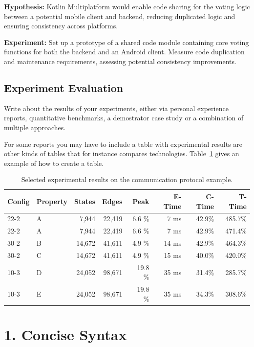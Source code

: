 \textbf{Hypothesis:} Kotlin Multiplatform would enable code sharing for the voting logic between a potential mobile client and backend, reducing duplicated logic and ensuring consistency across platforms.

\textbf{Experiment:} Set up a prototype of a shared code module containing core voting functions for both the backend and an Android client. Measure code duplication and maintenance requirements, assessing potential consistency improvements.


\subsection{Experiment Evaluation}

Write about the results of your experiments, either via personal experience reports, quantitative benchmarks, a demostrator case study or a combination of multiple approaches.


For some reports you may have to include a table with experimental
results are other kinds of tables that for instance compares
technologies. Table~\ref{tab:results} gives an example of how to create a table.

\begin{table}[bth]
	\centering
	\begin{tabular}{llrrrrrr}
		Config & Property & States & Edges & Peak & E-Time & C-Time & T-Time
		\\ \hline \hline
		22-2 & A   &    7,944  &   22,419  &  6.6  \%  &  7 ms & 42.9\% &  485.7\% \\
		22-2 & A   &    7,944  &   22,419  &  6.6  \%  &  7 ms & 42.9\% &  471.4\% \\
		30-2 & B   &   14,672  &   41,611  &  4.9  \%  & 14 ms & 42.9\% &  464.3\% \\
		30-2 & C   &   14,672  &   41,611  &  4.9  \%  & 15 ms & 40.0\% &  420.0\% \\ \hline
		10-3 & D   &   24,052  &   98,671  & 19.8  \%  & 35 ms & 31.4\% &  285.7\% \\
		10-3 & E   &   24,052  &   98,671  & 19.8  \%  & 35 ms & 34.3\% &  308.6\% \\
		\hline \hline
	\end{tabular}
	\caption{Selected experimental results on the communication protocol example.}
	\label{tab:results}
\end{table}


\section*{1. Concise Syntax}

